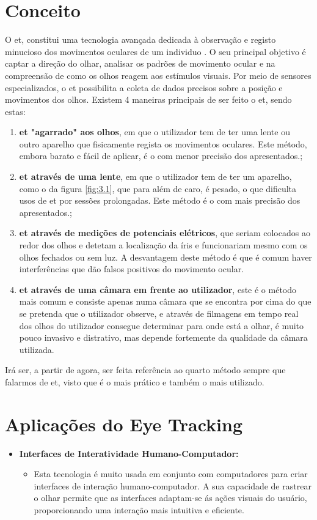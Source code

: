 \documentclass{report}
\begin{document}
\section{Conceito}
O \ac{et}, constitui uma tecnologia avançada dedicada à observação e registo minucioso dos movimentos oculares de um individuo \cite{EyeTracking}. O seu principal objetivo é captar a direção do olhar, analisar os padrões de movimento ocular e na compreensão de como os olhos reagem aos estímulos visuais. Por meio de sensores especializados, o \ac{et} possibilita a coleta de dados precisos sobre a posição e movimentos dos olhos.
Existem 4 maneiras principais de ser feito o \ac{et}, sendo estas:
\begin{enumerate}
    \item \textbf{\ac{et} "agarrado" aos olhos}, em que o utilizador tem de ter uma lente ou outro aparelho que fisicamente regista os movimentos oculares. Este método, embora barato e fácil de aplicar, é o com menor precisão dos apresentados.;
    \item \textbf{\ac{et} através de uma lente}, em que o utilizador tem de ter um aparelho, como o da figura \ref{fig:3.1}, que para além de caro, é pesado, o que dificulta usos de \ac{et} por sessões prolongadas. Este método é o com mais precisão dos apresentados.;
    \item \textbf{\ac{et} através de medições de potenciais elétricos}, que seriam colocados ao redor dos olhos e detetam    a localização da íris e funcionariam mesmo com os olhos fechados ou sem luz. A desvantagem deste método é que é comum haver interferências que dão falsos positivos do movimento ocular.
    \item \textbf{\ac{et} através de uma câmara em frente ao utilizador}, este é o método mais comum e consiste apenas numa câmara que se encontra por cima do que se pretenda que o utilizador observe, e através de filmagens em tempo real dos olhos do utilizador consegue determinar para onde está a olhar, é muito pouco invasivo e distrativo, mas depende fortemente da qualidade da câmara utilizada.
\end{enumerate}

Irá ser, a partir de agora, ser feita referência ao quarto método sempre que falarmos de \ac{et}, visto que é o mais prático e também o mais utilizado.

\section{Aplicações do Eye Tracking}
\begin{itemize}
    \item \textbf{Interfaces de Interatividade Humano-Computador:}

    
        \begin{itemize}
            \item Esta tecnologia é muito usada em conjunto com computadores para criar interfaces de interação humano-computador. A sua capacidade de rastrear o olhar permite que as interfaces adaptam-se ás ações visuais do usuário, proporcionando uma interação mais intuitiva e eficiente.
        \end{itemize}
    \end{itemize}
    
\end{document}
